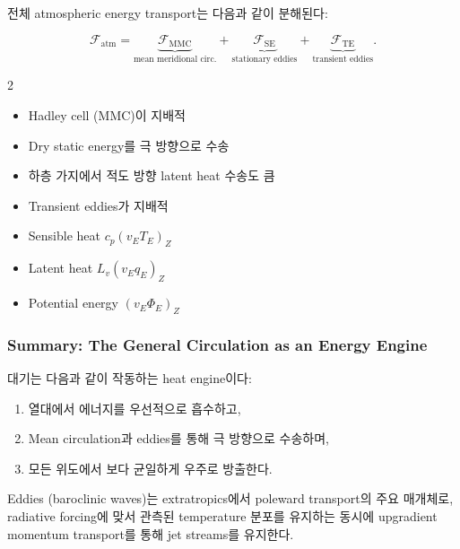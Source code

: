 전체 atmospheric energy transport는 다음과 같이 분해된다:

\begin{equation}\label{eq:atm_transport}
  \mathcal{F}_{\text{atm}} = \underbrace{\mathcal{F}_{\text{MMC}}}_{\text{mean meridional circ.}}
  + \underbrace{\mathcal{F}_{\text{SE}}}_{\text{stationary eddies}}
  + \underbrace{\mathcal{F}_{\text{TE}}}_{\text{transient eddies}}.
\end{equation}

\begin{multicols}{2}
\begin{itemize}
  \item Hadley cell (MMC)이 지배적
  \item Dry static energy를 극 방향으로 수송
  \item 하층 가지에서 적도 방향 latent heat 수송도 큼
\end{itemize}

\columnbreak

\begin{itemize}
  \item Transient eddies가 지배적
  \item Sensible heat $c_p(v_E T_E)_Z$
  \item Latent heat $L_v(v_E q_E)_Z$
  \item Potential energy $(v_E\Phi_E)_Z$
\end{itemize}
\end{multicols}


\subsubsection{Summary: The General Circulation as an Energy Engine}

\begin{remarkbox}
대기는 다음과 같이 작동하는 heat engine이다:
\begin{enumerate}
  \item 열대에서 에너지를 우선적으로 흡수하고,
  \item Mean circulation과 eddies를 통해 극 방향으로 수송하며,
  \item 모든 위도에서 보다 균일하게 우주로 방출한다.
\end{enumerate}
Eddies (baroclinic waves)는 extratropics에서 poleward transport의 주요 매개체로,
radiative forcing에 맞서 관측된 temperature 분포를 유지하는 동시에
upgradient momentum transport를 통해 jet streams를 유지한다.
\end{remarkbox}

